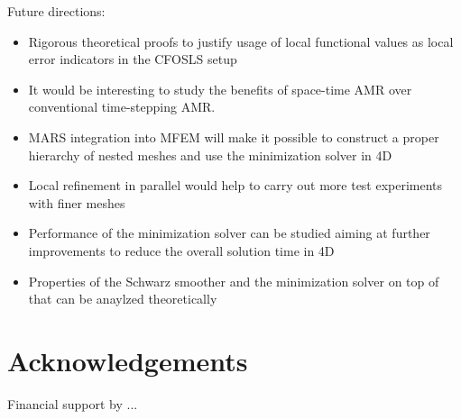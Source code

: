 \documentclass[a4paper,12pt]{amsart}
\numberwithin{equation}{section}
\begin{document}
Future directions:
\begin{itemize}
	\item Rigorous theoretical proofs to justify usage of local functional values as local error indicators in the CFOSLS setup
	\item It would be interesting to study the benefits of space-time AMR over conventional time-stepping AMR.
	\item MARS integration into MFEM will make it possible to construct a proper hierarchy of nested meshes and use the minimization solver in 4D
	\item Local refinement in parallel would help to carry out more test experiments with finer meshes
	\item Performance of the minimization solver can be studied aiming at further improvements to reduce the overall solution time in 4D
	\item Properties of the Schwarz smoother and the minimization solver on top of that can be anaylzed theoretically
\end{itemize}

\section{Acknowledgements}

Financial support by ...
\end{document}
